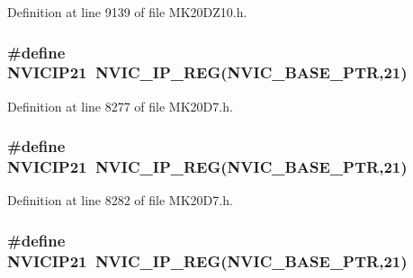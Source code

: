 Definition at line 9139 of file M\+K20\+D\+Z10.\+h.

\subsubsection[{\texorpdfstring{N\+V\+I\+C\+I\+P21}{NVICIP21}}]{\setlength{\rightskip}{0pt plus 5cm}\#define N\+V\+I\+C\+I\+P21~{\bf N\+V\+I\+C\+\_\+\+I\+P\+\_\+\+R\+EG}({\bf N\+V\+I\+C\+\_\+\+B\+A\+S\+E\+\_\+\+P\+TR},21)}\hypertarget{group___n_v_i_c___register___accessor___macros_ga59a753bd417621855f828ecf7afb56bc}{}\label{group___n_v_i_c___register___accessor___macros_ga59a753bd417621855f828ecf7afb56bc}


Definition at line 8277 of file M\+K20\+D7.\+h.

\subsubsection[{\texorpdfstring{N\+V\+I\+C\+I\+P21}{NVICIP21}}]{\setlength{\rightskip}{0pt plus 5cm}\#define N\+V\+I\+C\+I\+P21~{\bf N\+V\+I\+C\+\_\+\+I\+P\+\_\+\+R\+EG}({\bf N\+V\+I\+C\+\_\+\+B\+A\+S\+E\+\_\+\+P\+TR},21)}\hypertarget{group___n_v_i_c___register___accessor___macros_ga59a753bd417621855f828ecf7afb56bc}{}\label{group___n_v_i_c___register___accessor___macros_ga59a753bd417621855f828ecf7afb56bc}


Definition at line 8282 of file M\+K20\+D7.\+h.

\subsubsection[{\texorpdfstring{N\+V\+I\+C\+I\+P21}{NVICIP21}}]{\setlength{\rightskip}{0pt plus 5cm}\#define N\+V\+I\+C\+I\+P21~{\bf N\+V\+I\+C\+\_\+\+I\+P\+\_\+\+R\+EG}({\bf N\+V\+I\+C\+\_\+\+B\+A\+S\+E\+\_\+\+P\+TR},21)}\hypertarget{group___n_v_i_c___register___accessor___macros_ga59a753bd417621855f828ecf7afb56bc}{}\label{group___n_v_i_c___register___accessor___macros_ga59a753bd417621855f828ecf7afb56bc}


